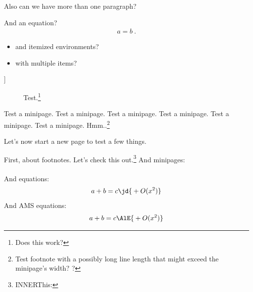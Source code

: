 \documentclass[10pt,a4paper,aps,reprint,notitlepage,nofootinbib]{revtex4-1}
\begin{document}
Also can we have more than one paragraph?

And an equation?
\begin{align}
  a = b\ .
\end{align}

\begin{itemize}
\item and itemized environments?
\item with multiple items?
\end{itemize}
]

\begin{figure}
  \centering
\begin{minipage}{\columnwidth}
  \caption[]{Test.\footnote{Does this work?}  }
  \label{fig:FigureTestfdionsafkjdnsa}
\end{minipage}
\end{figure}

\vspace{1cm}

\begin{minipage}{1.0\linewidth}
  Test a minipage.  Test a minipage.  Test a minipage.  Test a minipage.  Test a
  minipage.  Test a minipage. 
  Hmm..\footnote{Test footnote with a possibly long line length that might
    exceed the minipage's width? ?}
\end{minipage}


\clearpage
\onecolumngrid
Let's now start a new page to test a few things.

First, about footnotes. Let's check this out.\footnote{\ifinner INNER\fi This: }  And minipages:
\\
\\
And equations:
\begin{equation}
  a + b = c \text{\jd{\(\displaystyle{}+O(x^2)\)}}
\end{equation}
And AMS equations:
\begin{align}
  a + b = c \text{\AlE{\(\displaystyle{}+O(x^2)\)}}
\end{align}
\end{document}
